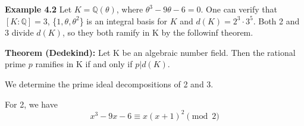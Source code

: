 \begin{flushleft}
    \quad\textbf{Example 4.2} Let $K= \mathbb{Q}(\theta)$, where $\theta ^3 -9 \theta -6 = 0.$
    One can verify that $[K : \mathbb{Q}] = 3$, \{$1, \theta, \theta ^2$\} is an integral basis for $K$ and $d(K)=2^3 \cdot 3^5$. 
    Both 2 and 3 divide $d(K)$, so they both ramify in K by the followinf theorem.
    
    \quad\textbf{Theorem (Dedekind):} Let K be an algebraic number field. Then the rational prime $p$ ramifies in K if and only if $p | d(K)$.

    We determine the prime ideal decompositions of 2 and 3. 
    
    For 2, we have
    \[
    x^3-9x-6 \equiv x(x+1)^2 \pmod{2}
    \]

\end{flushleft}